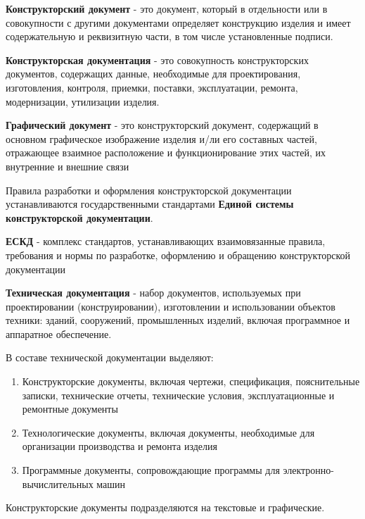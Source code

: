 \documentclass{article}
\begin{document}
\begin{flushleft}
\hfill

\textbf{Конструкторский документ} - это документ, который в отдельности или в совокупности с другими документами определяет конструкцию изделия и имеет содержательную и реквизитную части, в том числе установленные подписи.

\textbf{Конструкторская документация} - это совокупность конструкторских документов, содержащих данные, необходимые для проектирования, изготовления, контроля, приемки, поставки, эксплуатации, ремонта, модернизации, утилизации изделия.

\hfill

\textbf{Графический документ} - это конструкторский документ, содержащий в основном графическое изображение изделия и/ли его составных частей, отражающее взаимное расположение и функционирование этих частей, их внутренние и внешние связи

\hfill

Правила разработки и оформления конструкторской документации устанавливаются государственными стандартами \textbf{Единой системы конструкторской документации}.

\textbf{ЕСКД} - комплекс стандартов, устанавливающих взаимовязанные правила, требования и нормы по разработке, оформлению и обращению конструкторской документации

\hfill

\textbf{Техническая документация} - набор документов, используемых при проектировании (конструировании), изготовлении и использовании объектов техники: зданий, сооружений, промышленных изделий, включая программное и аппаратное обеспечение.

В составе технической документации выделяют:

\begin{enumerate}
    \item Конструкторские документы, включая чертежи, спецификация, пояснительные записки, технические отчеты, технические условия, эксплуатационные и ремонтные документы
    \item Технологические документы, включая документы, необходимые для организации производства и ремонта изделия
    \item Программные документы, сопровождающие программы для электронно-вычислительных машин
\end{enumerate}

Конструкторские документы подразделяются на текстовые и графические.

\end{flushleft}
\end{document}
